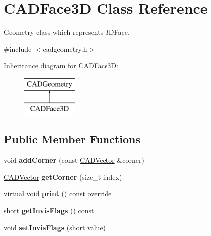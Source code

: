 \hypertarget{class_c_a_d_face3_d}{}\section{C\+A\+D\+Face3D Class Reference}
\label{class_c_a_d_face3_d}


Geometry class which represents 3\+D\+Face.  




{\ttfamily \#include $<$cadgeometry.\+h$>$}

Inheritance diagram for C\+A\+D\+Face3D\+:\begin{figure}[H]
\begin{center}
\leavevmode
\includegraphics[height=2.000000cm]{class_c_a_d_face3_d}
\end{center}
\end{figure}
\subsection*{Public Member Functions}
\begin{DoxyCompactItemize}
\item 
void {\bfseries add\+Corner} (const \hyperlink{class_c_a_d_vector}{C\+A\+D\+Vector} \&corner)\hypertarget{class_c_a_d_face3_d_aa173b3c57c8e5d223185f50a30b24d5c}{}\label{class_c_a_d_face3_d_aa173b3c57c8e5d223185f50a30b24d5c}

\item 
\hyperlink{class_c_a_d_vector}{C\+A\+D\+Vector} {\bfseries get\+Corner} (size\+\_\+t index)\hypertarget{class_c_a_d_face3_d_ae9c619d39375d4fe03cff322b28f71d9}{}\label{class_c_a_d_face3_d_ae9c619d39375d4fe03cff322b28f71d9}

\item 
virtual void {\bfseries print} () const  override\hypertarget{class_c_a_d_face3_d_ae7d28d2b9934dd233f262ed7498a56de}{}\label{class_c_a_d_face3_d_ae7d28d2b9934dd233f262ed7498a56de}

\item 
short {\bfseries get\+Invis\+Flags} () const \hypertarget{class_c_a_d_face3_d_a9d9bac1cf36a63993e185de8efbe034c}{}\label{class_c_a_d_face3_d_a9d9bac1cf36a63993e185de8efbe034c}

\item 
void {\bfseries set\+Invis\+Flags} (short value)\hypertarget{class_c_a_d_face3_d_a8dd54f639fc34e38cfba6c8688905523}{}\label{class_c_a_d_face3_d_a8dd54f639fc34e38cfba6c8688905523}

\end{DoxyCompactItemize}

